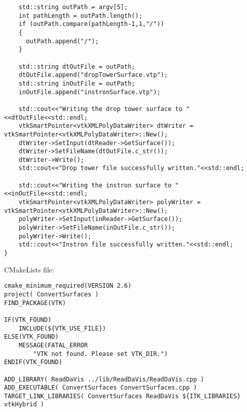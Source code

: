\begin{lstlisting}
	std::string outPath = argv[5];
	int pathLength = outPath.length();
	if (outPath.compare(pathLength-1,1,"/"))
	{
	  outPath.append("/");
	}
	
	std::string dtOutFile = outPath;
	dtOutFile.append("dropTowerSurface.vtp");
	std::string inOutFile = outPath;
	inOutFile.append("instronSurface.vtp");
	
	std::cout<<"Writing the drop tower surface to "<<dtOutFile<<std::endl;
	vtkSmartPointer<vtkXMLPolyDataWriter> dtWriter = vtkSmartPointer<vtkXMLPolyDataWriter>::New();
	dtWriter->SetInput(dtReader->GetSurface());
	dtWriter->SetFileName(dtOutFile.c_str());
	dtWriter->Write();
	std::cout<<"Drop tower file successfully written."<<std::endl;
	
	std::cout<<"Writing the instron surface to "<<inOutFile<<std::endl;
	vtkSmartPointer<vtkXMLPolyDataWriter> polyWriter = vtkSmartPointer<vtkXMLPolyDataWriter>::New();
	polyWriter->SetInput(inReader->GetSurface());
	polyWriter->SetFileName(inOutFile.c_str());
	polyWriter->Write();
	std::cout<<"Instron file successfully written."<<std::endl;
}
\end{lstlisting}
	
CMakeLists file:
\begin{lstlisting}
cmake_minimum_required(VERSION 2.6)
project( ConvertSurfaces )
FIND_PACKAGE(VTK)

IF(VTK_FOUND)
	INCLUDE(${VTK_USE_FILE})
ELSE(VTK_FOUND)
	MESSAGE(FATAL_ERROR
	    "VTK not found. Please set VTK_DIR.")
ENDIF(VTK_FOUND)

ADD_LIBRARY( ReadDaVis ../lib/ReadDaVis/ReadDaVis.cpp )
ADD_EXECUTABLE( ConvertSurfaces ConvertSurfaces.cpp )
TARGET_LINK_LIBRARIES( ConvertSurfaces ReadDaVis ${ITK_LIBRARIES} vtkHybrid )
\end{lstlisting}
